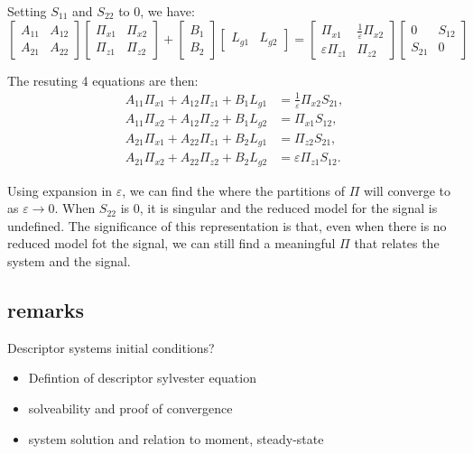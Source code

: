\documentclass{article}
\begin{document}
Setting $S_{11}$ and $S_{22}$ to 0, we have:
\begin{equation}
\begin{bmatrix}
A_{11} & A_{12} \\
A_{21} & A_{22}
\end{bmatrix}
\begin{bmatrix}
\Pi_{x1} & \Pi_{x2} \\
\Pi_{z1} & \Pi_{z2}
\end{bmatrix}
+
\begin{bmatrix}
B_{1} \\
B_{2}
\end{bmatrix}
\begin{bmatrix}
L_{g1} & L_{g2}
\end{bmatrix}
=
\begin{bmatrix}
\Pi_{x1} & \frac{1}{\varepsilon}\Pi_{x2} \\
\varepsilon \Pi_{z1} & \Pi_{z2}
\end{bmatrix}
\begin{bmatrix}
0 & S_{12} \\
S_{21} & 0
\end{bmatrix}
\end{equation}

The resuting 4 equations are then:
\begin{subequations}
\begin{align}
A_{11}\Pi_{x1} + A_{12}\Pi_{z1} + B_1 L_{g1} &= \frac{1}{\varepsilon} \Pi_{x2} S_{21}, \\
A_{11}\Pi_{x2} + A_{12}\Pi_{z2} + B_1 L_{g2} &= \Pi_{x1} S_{12}, \\
A_{21}\Pi_{x1} + A_{22}\Pi_{z1} + B_2 L_{g1} &= \Pi_{z2} S_{21}, \\
A_{21}\Pi_{x2} + A_{22}\Pi_{z2} + B_2 L_{g2} &= \varepsilon \Pi_{z1} S_{12}.
\end{align}
\end{subequations}

Using expansion in $\varepsilon$, we can find the where the partitions of $\Pi$ will converge to as $\varepsilon \to 0$.
When $S_{22}$ is 0, it is singular and the reduced model for the signal is undefined.
The significance of this representation is that, even when there is no reduced model fot the signal,
we can still find a meaningful $\Pi$ that relates the system and the signal.

\subsection{remarks}
Descriptor systems initial conditions?
\begin{itemize}
  \item Defintion of descriptor sylvester equation
  \item solveability and proof of convergence
  \item system solution and relation to moment, steady-state
\end{itemize}
\end{document}
